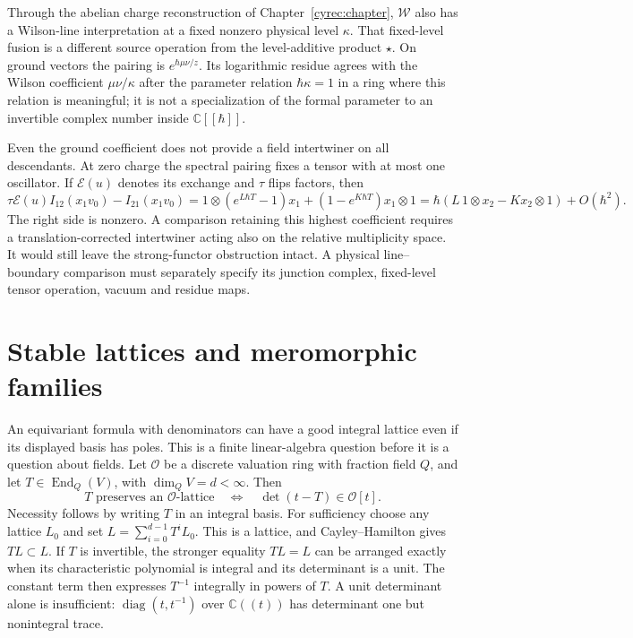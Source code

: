 Through the abelian charge reconstruction of
Chapter~\ref{cyrec:chapter}, \(\mathscr W\) also has a
Wilson-line interpretation at a fixed nonzero physical level
\(\kappa\). That fixed-level fusion is a different source operation
from the level-additive product \(\star\).
On ground vectors the pairing is \(e^{\hbar\mu\nu/z}\).
Its logarithmic residue agrees with the Wilson coefficient
\(\mu\nu/\kappa\) after the parameter relation \(\hbar\kappa=1\)
in a ring where this relation is meaningful; it is not a
specialization of the formal parameter to an invertible complex
number inside \(\mathbb C[[\hbar]]\).

Even the ground coefficient does not provide a field intertwiner
on all descendants. At zero charge the spectral pairing fixes a
tensor with at most one oscillator. If \(\mathcal E(u)\) denotes
its exchange and \(\tau\) flips factors, then
\[
 \tau\mathcal E(u)I_{12}(x_1v_0)-I_{21}(x_1v_0)
 =1\otimes(e^{L\hbar T}-1)x_1
       +(1-e^{K\hbar T})x_1\otimes1
 =\hbar(L\,1\otimes x_2-Kx_2\otimes1)+O(\hbar^2).
\]
The right side is nonzero. A comparison retaining this highest
coefficient requires a translation-corrected intertwiner acting
also on the relative multiplicity space. It would still leave
the strong-functor obstruction intact. A physical line--boundary
comparison must separately specify its junction complex,
fixed-level tensor operation, vacuum and residue maps.

\section{Stable lattices and meromorphic families}
\label{cyrep:sec:stable-lattices}

An equivariant formula with denominators can have a good integral
lattice even if its displayed basis has poles. This is a finite
linear-algebra question before it is a question about fields.
Let \(\mathcal O\) be a discrete valuation ring with fraction field
\(Q\), and let \(T\in\operatorname{End}_Q(V)\), with
\(\dim_QV=d<\infty\). Then
\begin{equation}\label{cyrep:eq:stable-lattice}
 T\text{ preserves an }\mathcal O\text{-lattice}
 \quad\Longleftrightarrow\quad
 \det(t-T)\in\mathcal O[t].
\end{equation}
Necessity follows by writing \(T\) in an integral basis.
For sufficiency choose any lattice \(L_0\) and set
\(L=\sum_{i=0}^{d-1}T^iL_0\). This is a lattice, and
Cayley--Hamilton gives \(TL\subset L\).
If \(T\) is invertible, the stronger equality \(TL=L\)
can be arranged exactly when its characteristic polynomial is
integral and its determinant is a unit. The constant term then
expresses \(T^{-1}\) integrally in powers of \(T\).
A unit determinant alone is insufficient:
\(\operatorname{diag}(t,t^{-1})\) over \(\mathbb C((t))\)
has determinant one but nonintegral trace.

